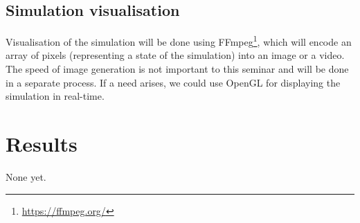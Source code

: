 \documentclass[9pt]{pnas-new}
\begin{document}
\subsection{Simulation visualisation}

Visualisation of the simulation will be done using FFmpeg\footnote{\url{https://ffmpeg.org/}}, which will encode an array of pixels (representing a state of the simulation) into an image or a video.
The speed of image generation is not important to this seminar and will be done in a separate process. If a need arises, we could use OpenGL for displaying the simulation in real-time.























\section*{Results}

None yet.


\end{document}

